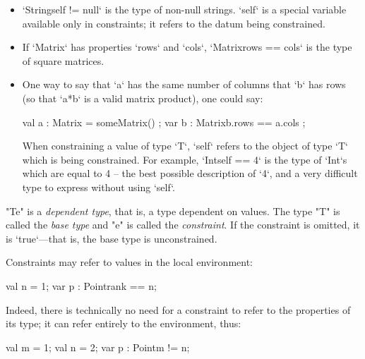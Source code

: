 \begin{itemize}
\item \xcd`String{self != null}` is the type of non-null strings.  \xcd`self`
      is a special variable available only in constraints; it refers to the
      datum being constrained.   
\item If \xcd`Matrix` has properties \xcd`rows` and \xcd`cols`, 
      \xcd`Matrix{rows == cols}` is the type of square matrices.
\item One way to say that \xcd`a` has the same number of columns that \xcd`b`
      has rows (so that \xcd`a*b` is a valid matrix product), one could say: 
\begin{xten}
  val a : Matrix = someMatrix() ;
  var b : Matrix{b.rows == a.cols} ;
\end{xten}



When constraining a value of type \xcd`T`, \xcd`self` refers to the object of
type \xcd`T` which is being constrained.  For example, \xcd`Int{self == 4}` is
the type of \xcd`Int`s which are equal to 4 -- the best possible description
of \xcd`4`, and a very difficult type to express without using \xcd`self`.  
\end{itemize}





\xcd"T{e}" is a {\em dependent type}, that is, a type dependent on values. The
type \xcd"T" is called the {\em base type} and \xcd"e" is called the {\em
  constraint}. If the constraint is omitted, it is \xcd`true`---that is, the
  base type is unconstrained.

Constraints may refer to values in the local environment: 
\begin{xten}
     val n = 1;
     var p : Point{rank == n};
\end{xten}
Indeed, there is technically no need for a constraint to refer to the
properties of its type; it can refer entirely to the environment, thus: 
\begin{xten}
     val m = 1;
     val n = 2;
     var p : Point{m != n};
\end{xten}

